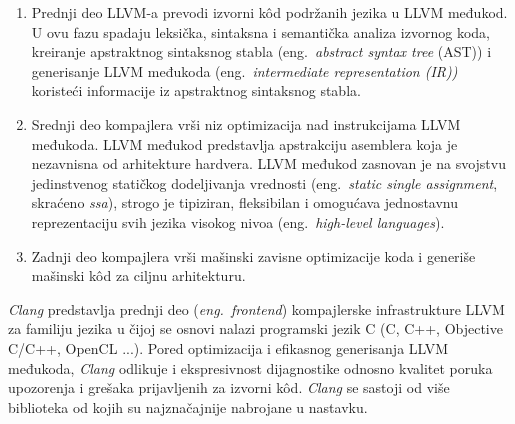 \documentclass[12pt,oneside]{memoir}
\begin{document}
\begin{enumerate}
  \item Prednji deo LLVM-a prevodi izvorni k\^od podr\v{z}anih jezika u LLVM međukod. U ovu fazu spadaju leksi\v{c}ka, sintaksna i semanti\v{c}ka analiza
  izvornog koda, kreiranje apstraktnog sintaksnog stabla (eng.~\textit{abstract syntax tree} (AST)) i generisanje LLVM međukoda (eng.~\textit{intermediate representation (IR))} koriste\'{c}i informacije iz apstraktnog sintaksnog stabla.
  \item{Srednji deo kompajlera vr\v{s}i niz optimizacija nad instrukcijama LLVM međukoda. LLVM međukod predstavlja apstrakciju asemblera koja je nezavnisna od arhitekture hardvera. LLVM međukod zasnovan je na svojstvu jedinstvenog stati\v{c}kog dodeljivanja vrednosti (eng.~\textit{static single assignment}, skra\'{c}eno \textit{ssa}), strogo je tipiziran, fleksibilan i omogu\'{c}ava jednostavnu reprezentaciju svih jezika visokog nivoa (eng.~\textit{high-level languages}).}
  \item{Zadnji deo kompajlera vr\v{s}i ma\v{s}inski zavisne optimizacije koda i generi\v{s}e ma\v{s}inski k\^{o}d za ciljnu arhitekturu.}
\end{enumerate}



\textit{Clang} predstavlja prednji deo (\textit{eng.~frontend}) kompajlerske infrastrukture LLVM za familiju jezika u \v{c}ijoj se osnovi nalazi programski jezik C (C, C++, Objective C/C++, OpenCL ...). Pored optimizacija i efikasnog generisanja LLVM međukoda, \textit{Clang} odlikuje i ekspresivnost dijagnostike odnosno kvalitet poruka upozorenja i grešaka prijavljenih za izvorni k\^{o}d. \textit{Clang} se sastoji od vi\v{s}e biblioteka od kojih su najznačajnije nabrojane u nastavku.
\end{document}
